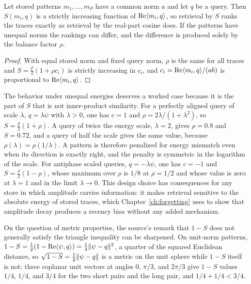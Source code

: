 \begin{proposition}\label{prop:ranking}
Let stored patterns $m_1,\dots,m_P$ have a common norm $a$ and let $q$ be a query. Then $S(m_i,q)$ is a strictly increasing function of $\operatorname{Re}\langle m_i,q\rangle$, so retrieval by $S$ ranks the traces exactly as retrieval by the real-part cosine does. If the patterns have unequal norms the rankings can differ, and the difference is produced solely by the balance factor $\rho$.
\end{proposition}

\begin{proof}
With equal stored norm and fixed query norm, $\rho$ is the same for all traces and $S=\frac\rho2(1+\rho c_i)$ is strictly increasing in $c_i$, and $c_i=\operatorname{Re}\langle m_i,q\rangle/(ab)$ is proportional to $\operatorname{Re}\langle m_i,q\rangle$.
\end{proof}

The behavior under unequal energies deserves a worked case because it is the part of $S$ that is not inner-product similarity. For a perfectly aligned query of scale $\lambda$, $q=\lambda\psi$ with $\lambda>0$, one has $c=1$ and $\rho=2\lambda/(1+\lambda^2)$, so $S=\frac\rho2(1+\rho)$. A query of twice the energy scale, $\lambda=2$, gives $\rho=0.8$ and $S=0.72$, and a query of half the scale gives the same value, because $\rho(\lambda)=\rho(1/\lambda)$. A pattern is therefore penalized for energy mismatch even when its direction is exactly right, and the penalty is symmetric in the logarithm of the scale. For antiphase scaled queries, $q=-\lambda\psi$, one has $c=-1$ and $S=\frac\rho2(1-\rho)$, whose maximum over $\rho$ is $1/8$ at $\rho=1/2$ and whose value is zero at $\lambda=1$ and in the limit $\lambda\to0$. This design choice has consequences for any store in which amplitude carries information: it makes retrieval sensitive to the absolute energy of stored traces, which Chapter~\ref{ch:forgetting} uses to show that amplitude decay produces a recency bias without any added mechanism.

On the question of metric properties, the source's remark that $1-S$ does not generally satisfy the triangle inequality can be sharpened. On unit-norm patterns, $1-S=\frac12(1-\operatorname{Re}\langle \psi,q\rangle)=\frac14\lVert \psi-q\rVert^2$, a quarter of the squared Euclidean distance, so $\sqrt{1-S}=\frac12\lVert \psi-q\rVert$ is a metric on the unit sphere while $1-S$ itself is not: three coplanar unit vectors at angles $0$, $\pi/3$, and $2\pi/3$ give $1-S$ values $1/4$, $1/4$, and $3/4$ for the two short pairs and the long pair, and $1/4+1/4<3/4$.

